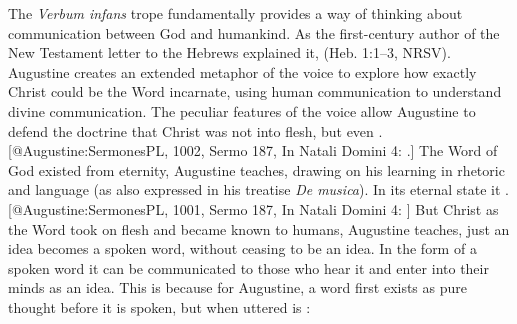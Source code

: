 The \emph{Verbum infans} trope fundamentally provides a way of thinking about
communication between God and humankind.
As the first-century author of the New Testament letter to the Hebrews explained
it,  (Heb. 1:1--3, NRSV). 
Augustine creates an extended metaphor of the voice to explore how exactly Christ
could be the Word incarnate, using human communication to understand divine
communication.
The peculiar features of the voice allow Augustine to defend the doctrine that
Christ was not  into flesh, but  even .
[@Augustine:SermonesPL, 1002, Sermo 187, In Natali Domini 4:
.]
The Word of God existed from eternity, Augustine teaches, drawing on his
learning in rhetoric and language (as also expressed in his treatise \emph{De
musica}).
In its eternal state it .
[@Augustine:SermonesPL, 1001, Sermo 187, In Natali Domini 4:
] 
But Christ as the Word took on flesh and became known to humans, Augustine
teaches, just an idea becomes a spoken word, without ceasing to be an idea.
In the form of a spoken word it can be communicated to those who hear it and
enter into their minds as an idea.
This is because for Augustine, a word first exists as pure thought before it is
spoken, but when uttered is :

